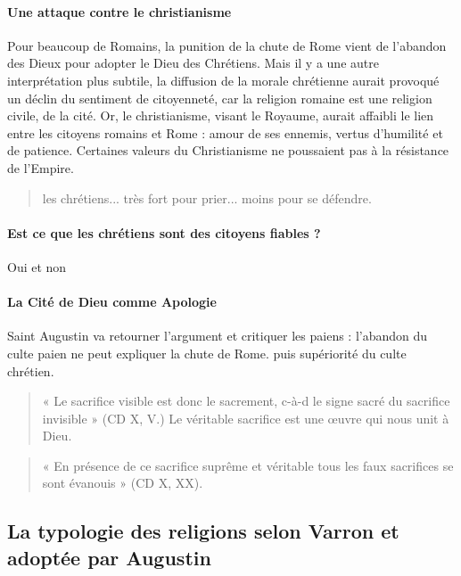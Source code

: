 \paragraph{Une attaque contre le christianisme} Pour beaucoup de Romains, la punition de la chute de Rome vient de l'abandon des Dieux pour adopter le Dieu des Chrétiens. Mais il y a une autre interprétation plus subtile, la diffusion de la morale chrétienne aurait provoqué un déclin du sentiment de citoyenneté, car la religion romaine est une religion civile, de la cité. Or, le christianisme, visant le Royaume, aurait affaibli le lien entre les citoyens romains et Rome : amour de ses ennemis, vertus d'humilité et de patience. Certaines valeurs du Christianisme ne poussaient pas à la résistance de l'Empire.

\begin{quote}
    les chrétiens... très fort pour prier... moins pour se défendre.

\end{quote}

\paragraph{Est ce que les chrétiens sont des citoyens fiables ? } Oui et non

\paragraph{La Cité de Dieu comme Apologie} Saint Augustin va retourner l'argument et critiquer les paiens : 
l'abandon du culte paien ne peut expliquer la chute de Rome. puis supériorité du culte chrétien.

\begin{quote}
    « Le sacrifice visible est donc le sacrement, c-à-d le signe sacré du sacrifice invisible » (CD X, V.) Le véritable sacrifice est une œuvre qui nous unit à Dieu. 
\end{quote}

\begin{quote}
    « En présence de ce sacrifice suprême et véritable tous les faux sacrifices se sont évanouis » (CD X, XX). 
\end{quote}


\subsection{La typologie des religions selon Varron et adoptée par Augustin}

